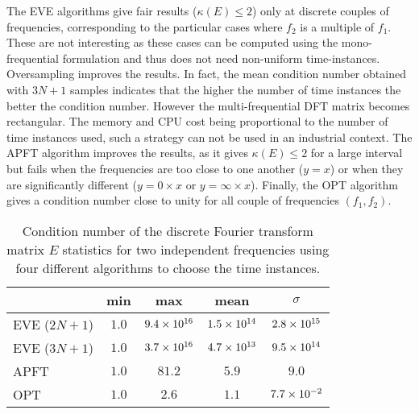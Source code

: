 The EVE algorithms give fair results ($\kappa(E) \leq 2$) only at
discrete couples of frequencies, corresponding to the particular cases where $f_2$ is a
multiple of $f_1$. These are not interesting as these
cases can be computed using the mono-frequential formulation and thus does not
need non-uniform time-instances. Oversampling improves the results. 
In fact, the mean condition number obtained
with $3N + 1$ samples indicates that the higher the number of time instances
the better the condition number. However the multi-frequential DFT
matrix becomes rectangular. The memory and CPU cost being proportional to 
the number of time instances used, such a strategy can not be
used in an industrial context. The APFT
algorithm improves the results, as it gives $\kappa (E) \leq 2$ 
for a large interval but fails when the frequencies
are too close to one another ($y=x$) or when they are significantly
different ($y=0 \times x$ or $y = \infty \times x$).  
Finally, the OPT algorithm gives a condition number close to unity for
all couple of frequencies $(f_1, f_2)$. 
\begin{table}[htb]
  \centering
  \begin{tabular}{lcccc}
    \toprule
    \phantom{abdefghijk} & min & max & mean & $\sigma$ \\
    \midrule
    EVE ($2N + 1$) & $1.0$ & $9.4\times 10^{16}$ & $1.5\times 10^{14}$ & $2.8\times 10^{15}$ \\
    EVE ($3N + 1$) & $1.0$ & $3.7\times 10^{16}$ & $4.7\times 10^{13}$ & $9.5\times 10^{14}$ \\
    APFT & $1.0$ & $81.2$ & $5.9$ & $9.0$ \\
    OPT & $1.0$ & $2.6$ & $1.1$ & $7.7\times 10^{-2}$ \\
    \bottomrule
  \end{tabular}
  \caption{Condition number of the discrete Fourier transform matrix $E$
  statistics for two independent frequencies using four different algorithms
  to choose the time instances.}
  \label{tab:algo_sum}
\end{table} 

